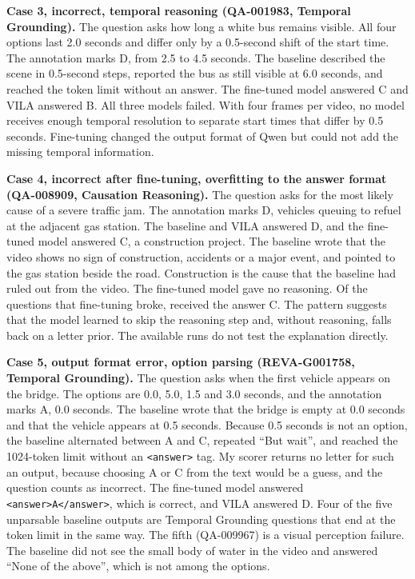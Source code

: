 \documentclass[11pt]{article}
\begin{document}
\textbf{Case 3, incorrect, temporal reasoning (QA-001983, Temporal Grounding).} The question asks how long a white bus remains visible. All four options last 2.0 seconds and differ only by a 0.5-second shift of the start time. The annotation marks D, from 2.5 to 4.5 seconds. The baseline described the scene in 0.5-second steps, reported the bus as still visible at 6.0 seconds, and reached the token limit without an answer. The fine-tuned model answered C and VILA answered B. All three models failed. With four frames per video, no model receives enough temporal resolution to separate start times that differ by 0.5 seconds. Fine-tuning changed the output format of Qwen but could not add the missing temporal information.

\textbf{Case 4, incorrect after fine-tuning, overfitting to the answer format (QA-008909, Causation Reasoning).} The question asks for the most likely cause of a severe traffic jam. The annotation marks D, vehicles queuing to refuel at the adjacent gas station. The baseline and VILA answered D, and the fine-tuned model answered C, a construction project. The baseline wrote that the video shows no sign of construction, accidents or a major event, and pointed to the gas station beside the road. Construction is the cause that the baseline had ruled out from the video. The fine-tuned model gave no reasoning. Of the \Loss{} questions that fine-tuning broke, \LossPickedC{} received the answer C. The pattern suggests that the model learned to skip the reasoning step and, without reasoning, falls back on a letter prior. The available runs do not test the explanation directly.

\textbf{Case 5, output format error, option parsing (REVA-G001758, Temporal Grounding).} The question asks when the first vehicle appears on the bridge. The options are 0.0, 5.0, 1.5 and 3.0 seconds, and the annotation marks A, 0.0 seconds. The baseline wrote that the bridge is empty at 0.0 seconds and that the vehicle appears at 0.5 seconds. Because 0.5 seconds is not an option, the baseline alternated between A and C, repeated ``But wait'', and reached the 1024-token limit without an \texttt{<answer>} tag. My scorer returns no letter for such an output, because choosing A or C from the text would be a guess, and the question counts as incorrect. The fine-tuned model answered \texttt{<answer>A</answer>}, which is correct, and VILA answered D. Four of the five unparsable baseline outputs are Temporal Grounding questions that end at the token limit in the same way. The fifth (QA-009967) is a visual perception failure. The baseline did not see the small body of water in the video and answered ``None of the above'', which is not among the options.
\end{document}
